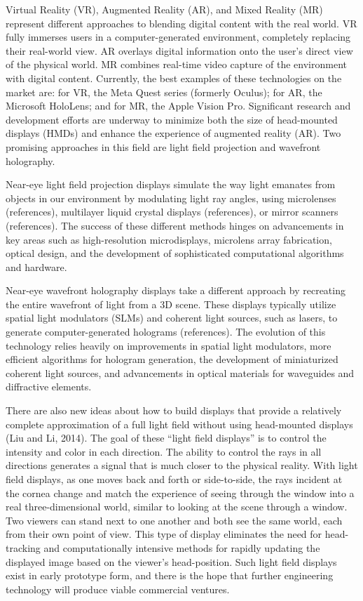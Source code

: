 \documentclass[
  letterpaper,
]{book}
\begin{document}
Virtual Reality (VR), Augmented Reality (AR), and Mixed Reality (MR)
represent different approaches to blending digital content with the real
world. VR fully immerses users in a computer-generated environment,
completely replacing their real-world view. AR overlays digital
information onto the user's direct view of the physical world. MR
combines real-time video capture of the environment with digital
content. Currently, the best examples of these technologies on the
market are: for VR, the Meta Quest series (formerly Oculus); for AR, the
Microsoft HoloLens; and for MR, the Apple Vision Pro. Significant
research and development efforts are underway to minimize both the size
of head-mounted displays (HMDs) and enhance the experience of augmented
reality (AR). Two promising approaches in this field are light field
projection and wavefront holography.

Near-eye light field projection displays simulate the way light emanates
from objects in our environment by modulating light ray angles, using
microlenses (references), multilayer liquid crystal displays
(references), or mirror scanners (references). The success of these
different methods hinges on advancements in key areas such as
high-resolution microdisplays, microlens array fabrication, optical
design, and the development of sophisticated computational algorithms
and hardware.

Near-eye wavefront holography displays take a different approach by
recreating the entire wavefront of light from a 3D scene. These displays
typically utilize spatial light modulators (SLMs) and coherent light
sources, such as lasers, to generate computer-generated holograms
(references). The evolution of this technology relies heavily on
improvements in spatial light modulators, more efficient algorithms for
hologram generation, the development of miniaturized coherent light
sources, and advancements in optical materials for waveguides and
diffractive elements.

There are also new ideas about how to build displays that provide a
relatively complete approximation of a full light field without using
head-mounted displays (Liu and Li, 2014). The goal of these ``light
field displays'' is to control the intensity and color in each
direction. The ability to control the rays in all directions generates a
signal that is much closer to the physical reality. With light field
displays, as one moves back and forth or side-to-side, the rays incident
at the cornea change and match the experience of seeing through the
window into a real three-dimensional world, similar to looking at the
scene through a window. Two viewers can stand next to one another and
both see the same world, each from their own point of view. This type of
display eliminates the need for head-tracking and computationally
intensive methods for rapidly updating the displayed image based on the
viewer's head-position. Such light field displays exist in early
prototype form, and there is the hope that further engineering
technology will produce viable commercial ventures.
\end{document}
